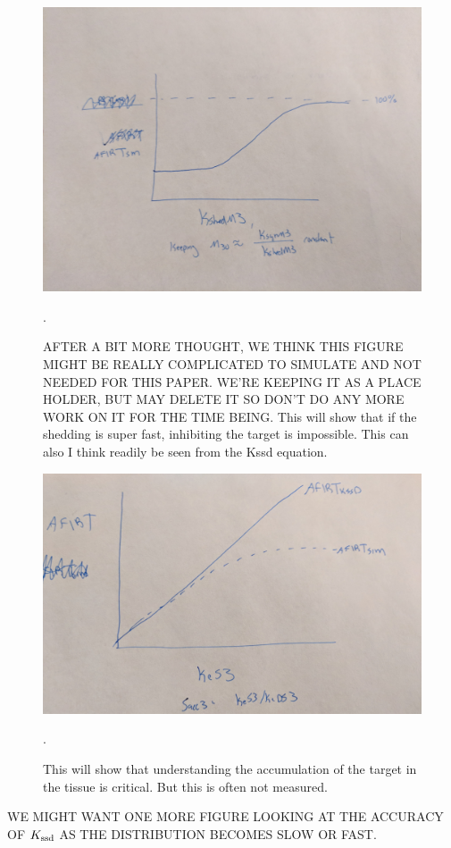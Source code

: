 \begin{figure}[H]
\centering
\includegraphics[width=\textwidth]{figures/FastShedding.jpg}
\caption{AFTER A BIT MORE THOUGHT, WE THINK THIS FIGURE MIGHT BE REALLY COMPLICATED TO SIMULATE AND NOT NEEDED FOR THIS PAPER.  WE'RE KEEPING IT AS A PLACE HOLDER, BUT MAY DELETE IT SO DON'T DO ANY MORE WORK ON IT FOR THE TIME BEING. This will show that if the shedding is super fast, inhibiting the target is impossible.  This can also I think readily be seen from the Kssd equation. 
\label{fig:shedding}}.
\end{figure}

\begin{figure}[H]
\centering
\includegraphics[width=\textwidth]{figures/SolubleAccumulation.jpg}
\caption{This will show that understanding the accumulation of the target in the tissue is critical.  But this is often not measured.  
\label{fig:accumulation}}.
\end{figure}

WE MIGHT WANT ONE MORE FIGURE LOOKING AT THE ACCURACY OF $K_\text{ssd}$ AS THE DISTRIBUTION BECOMES SLOW OR FAST.